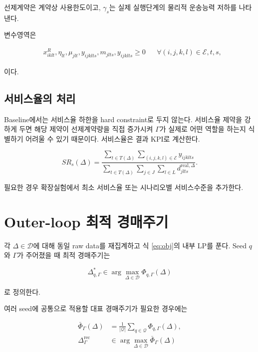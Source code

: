 \documentclass[11pt,a4paper]{article}
\newcommand{\Dset}{\mathcal D}
\newcommand{\Eset}{\mathcal E}
\begin{document}
선제계약은 계약상 사용한도이고,
$\gamma_s$는 실제 실행단계의 물리적 운송능력 저하를 나타낸다.

변수영역은

\begin{align}
&x^R_{iklt},\eta_{lt},\mu_{jlt},y_{ijklts},m_{jlts},y_{ijklts}\ge0
&&\forall (i,j,k,l)\in\Eset,t,s,
\end{align}

이다.

\subsection{서비스율의 처리}

Baseline에서는 서비스율 하한을 hard constraint로 두지 않는다.
서비스율 제약을 강하게 두면 해당 제약이 선제계약량을 직접 증가시켜
$\Gamma$가 실제로 어떤 역할을 하는지 식별하기 어려울 수 있기 때문이다.
서비스율은 결과 KPI로 계산한다.

\begin{equation}
SR_s(\Delta)
=
\frac{
\sum_{t\in T(\Delta)}
\sum_{(i,j,k,l)\in\Eset}y_{ijklts}
}{
\sum_{t\in T(\Delta)}
\sum_{j\in J}\sum_{l\in L}d^{\mathrm{real},\Delta}_{jlts}
}.
\label{eq:service-kpi}
\end{equation}

필요한 경우 확장실험에서 최소 서비스율 또는 시나리오별 서비스수준을 추가한다.

\section{Outer-loop 최적 경매주기}

각 $\Delta\in\Dset$에 대해 동일 raw data를 재집계하고
식 \eqref{eq:obj}의 내부 LP를 푼다.
Seed $q$와 $\Gamma$가 주어졌을 때 최적 경매주기는

\begin{equation}
\Delta^*_{q,\Gamma}
\in
\arg\max_{\Delta\in\Dset}
\Phi_{q,\Gamma}(\Delta)
\end{equation}

로 정의한다.

여러 seed에 공통으로 적용할 대표 경매주기가 필요한 경우에는

\begin{align}
\bar\Phi_{\Gamma}(\Delta)
&=
\frac{1}{|\mathcal Q|}
\sum_{q\in\mathcal Q}
\Phi_{q,\Gamma}(\Delta),\\
\Delta^{\mathrm{rec}}_{\Gamma}
&\in
\arg\max_{\Delta\in\Dset}
\bar\Phi_{\Gamma}(\Delta)
\end{align}
\end{document}
